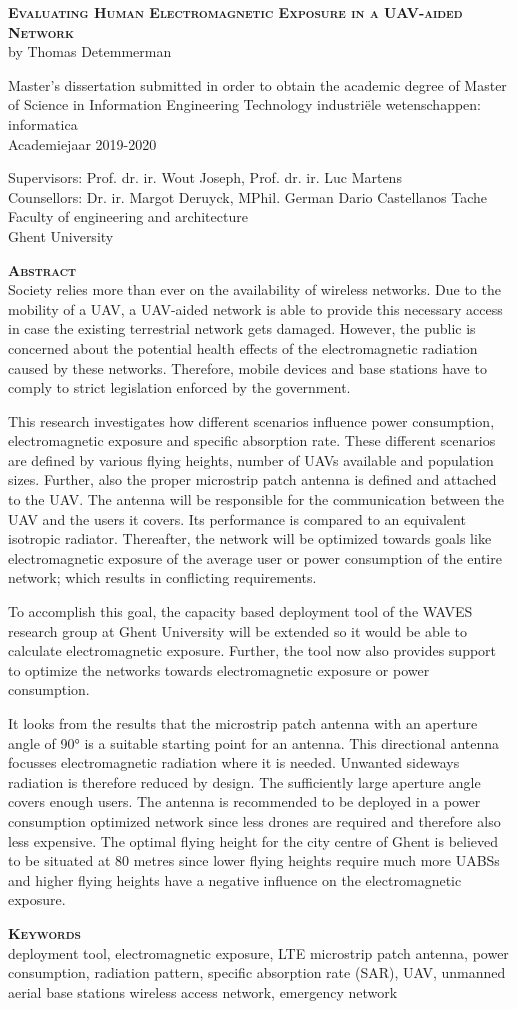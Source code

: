 \begin{center}
\textsc{\textbf{\Huge Evaluating Human Electromagnetic Exposure in a UAV-aided Network}}\\
by Thomas Detemmerman

Master's dissertation submitted in order to obtain the academic degree of Master of Science in Information Engineering Technology
industri\"ele wetenschappen: informatica\\
Academiejaar 2019-2020

Supervisors: Prof. dr. ir. Wout Joseph, Prof. dr. ir. Luc Martens\\
Counsellors: Dr. ir. Margot Deruyck, MPhil. German Dario Castellanos Tache\\
Faculty of engineering and architecture\\
Ghent University
\end{center}
\textsc{\textbf{\LARGE Abstract}}\\
Society relies more than ever on the availability of wireless networks.
Due to the mobility of a UAV, a UAV-aided network is able to provide this necessary access in case the existing terrestrial network gets damaged.
However,  the public is 
concerned about the potential health effects of the electromagnetic radiation caused by these networks.
Therefore, mobile devices and base stations have to comply to strict legislation enforced by the government.

This research investigates how different scenarios influence power consumption, electromagnetic exposure and specific absorption rate.
These different scenarios are defined by various flying heights, number of UAVs available and population sizes. Further, also 
the proper microstrip patch antenna is defined and attached to the UAV. 
The antenna will be responsible for the communication between the UAV and the users it covers.
Its performance is compared to  
an equivalent isotropic radiator.
Thereafter, the network will be optimized towards goals like electromagnetic exposure of the average user or 
power consumption of the entire network; which results in conflicting requirements.

To accomplish this goal, the capacity based deployment tool of the WAVES research group at Ghent University
will be extended so it would be able to calculate electromagnetic exposure.
Further, the tool now also provides support to optimize the networks towards electromagnetic exposure or power consumption.

It looks from the results that 
the microstrip patch antenna with an aperture angle of \ang{90} is a suitable starting point for an antenna. 
This directional antenna focusses electromagnetic radiation where it is needed. Unwanted sideways radiation 
is therefore reduced by design.
The sufficiently large aperture angle covers enough users. The antenna is recommended to be deployed in a power consumption 
optimized network since less drones are required and therefore also less expensive.
The optimal flying height for the city centre of Ghent is believed to be situated at 80 metres since lower flying heights require much more UABSs and
higher flying heights have a negative influence on the electromagnetic exposure.  

\textsc{\textbf{\LARGE Keywords}}\\
deployment tool,  electromagnetic exposure, LTE
microstrip patch antenna, power consumption,
radiation pattern, specific absorption rate (SAR),
UAV, unmanned aerial base stations
wireless access network, emergency network